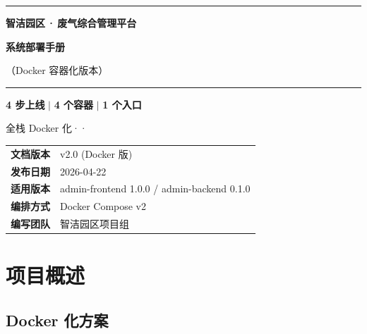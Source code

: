 \documentclass[UTF8,a4paper,11pt]{ctexart}
\begin{document}
\begin{titlepage}
\centering
\vspace*{2.5cm}
{\color{accentblue}\rule{14cm}{1.2pt}}\par
\vspace{0.4cm}
{\Huge\bfseries 智洁园区\,·\,废气综合管理平台\par}
\vspace{0.6cm}
{\LARGE\bfseries\color{accentblue} 系统部署手册\par}
\vspace{0.2cm}
{\Large\color{accentcyan}（Docker 容器化版本）\par}
\vspace{0.3cm}
{\color{accentblue}\rule{14cm}{1.2pt}}\par
\vspace{1.6cm}
\begin{tcolorbox}[colback=softgray, colframe=accentblue, sharp corners, boxrule=0.6pt, width=12cm]
\centering
\large\textbf{4 步上线} \quad $|$ \quad
\textbf{4 个容器} \quad $|$ \quad
\textbf{1 个入口}\par
\vspace{4pt}
\small 全栈 Docker 化\quad·\quad·
\end{tcolorbox}
\vspace{1.6cm}
\begin{tabular}{rl}
  \textbf{文档版本} & v2.0 (Docker 版) \\
  \textbf{发布日期} & 2026-04-22 \\
  \textbf{适用版本} & admin-frontend 1.0.0 / admin-backend 0.1.0 \\
  \textbf{编排方式} & Docker Compose v2 \\
  \textbf{编写团队} & 智洁园区项目组 \\
\end{tabular}
\vspace{2cm}
\end{titlepage}

\tableofcontents
\newpage

\section{项目概述}

\subsection{Docker 化方案}
\end{document}
